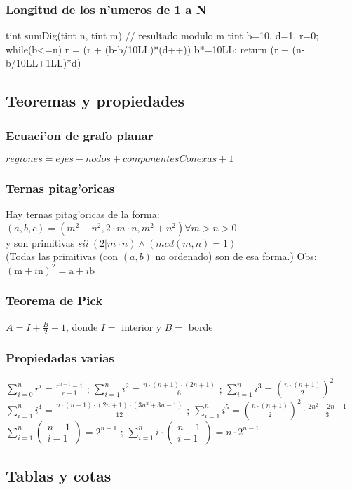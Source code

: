 \documentclass[10pt,landscape,twocolumn,a4paper,notitlepage]{article}
\newcommand{\comb}[2]{\left( \begin{array}{c} #1 \\ #2 \end{array}\right)}
\begin{document}
\subsubsection{Longitud de los n'umeros de 1 a N}%
\begin{code}
tint sumDig(tint n, tint m){ // resultado modulo m
    tint b=10, d=1, r=0;
    while(b<=n){
        r = (r + (b-b/10LL)*(d++))%
        b*=10LL;
    }
    return (r + (n-b/10LL+1LL)*d)%
}
\end{code}
%
\subsection{Teoremas y propiedades}%
\subsubsection{Ecuaci'on de grafo planar}
$regiones = ejes - nodos + componentesConexas + 1$
\subsubsection{Ternas pitag'oricas}
Hay ternas pitag'oricas de la forma: $(a,b,c) = ( m^2-n^2 , 2\cdot m\cdot n, m^2+n^2 ) \forall m > n > 0 $\\
y son primitivas \emph{sii} $(2 | m\cdot n) \land (mcd(m, n) = 1)$\\
(Todas las primitivas (con $(a,b)$ no ordenado) son de esa forma.) Obs: $(\mathrm{m}+i\mathrm{n})^2 = \mathrm{a}+i\mathrm{b}$
\subsubsection{Teorema de Pick}
$A = I + \frac{B}{2} - 1$, donde $I =$ interior y $B =$ borde
%
\subsubsection{Propiedadas varias}
$\sum_{i=0}^n{r^i} = \frac{r^{n+1}-1}{r-1}$ ; $\sum_{i=1}^n{i^2} = \frac{n\cdot(n+1)\cdot(2n+1)}{6}$ ;
$\sum_{i=1}^n{i^3} = \left(\frac{n\cdot(n+1)}{2}\right)^2$ \\
$\sum_{i=1}^n{i^4} = \frac{n\cdot(n+1)\cdot(2n+1)\cdot(3n^2+3n-1)}{12}$ ;
$\sum_{i=1}^{ n} i^5 = \left(\frac{ n \cdot (n+1)}{2}\right) ^2 \cdot \frac{2 n ^2 + 2n - 1}{3}$ \\
%
$\sum_{i=1}^n{\comb{n-1}{i-1}} = 2^{n-1}$ ; $\sum_{i=1}^n{i\cdot\comb{n-1}{i-1}} = n\cdot2^{n-1}$
%
\subsection{Tablas y cotas}
\end{document}
